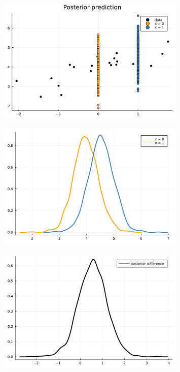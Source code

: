 \documentclass[aspectratio=169,xcolor=svgnames]{beamer}
\begin{document}
\begin{frame}
\begin{figure}[ht]
  \centering
  \includegraphics[width=0.8\textwidth]{figures/predictions.pdf}
  \caption{\label{fig:label} }
\end{figure}
\end{frame}

\begin{frame}
\begin{figure}[ht]
  \centering
  \includegraphics[width=0.8\textwidth]{figures/prediction_distrubtions.pdf}
  \caption{\label{fig:label} }
\end{figure}
\end{frame}

\begin{frame}
\begin{figure}[ht]
  \centering
  \includegraphics[width=0.8\textwidth]{figures/prediction_difference.pdf}
  \caption{\label{fig:label} }
\end{figure}
\end{frame}
\end{document}
